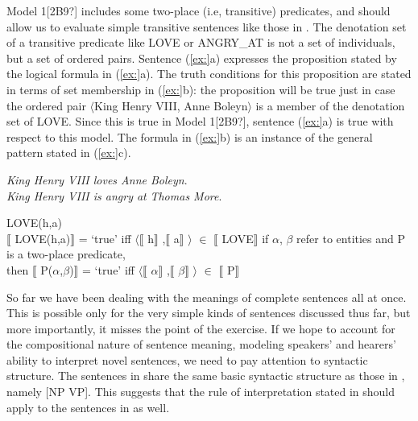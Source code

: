 Model 1[2B9?] includes some two-place (i.e, transitive) predicates, and should allow us to evaluate simple transitive sentences like those in . The denotation set of a transitive predicate like LOVE or ANGRY\_AT is not a set of individuals, but a set of ordered pairs. Sentence (\ref{ex:}a) expresses the proposition stated by the logical formula in (\ref{ex:}a). The truth conditions for this proposition are stated in terms of set membership in (\ref{ex:}b): the proposition will be true just in case the ordered pair $\langle$King Henry VIII, Anne Boleyn$\rangle$ is a member of the denotation set of LOVE. Since this is true in Model 1[2B9?], sentence (\ref{ex:}a) is true with respect to this model. The formula in (\ref{ex:}b) is an instance of the general pattern stated in (\ref{ex:}c).


\ea
\ea \textit{King Henry VIII loves Anne Boleyn}.\\
\ex \textit{King Henry VIII is angry at} \textit{Thomas More}.
                       \z
\z

\ea
\ea  LOVE(h,a)\\
\ex  $\llbracket$ LOVE(h,a)$\rrbracket$  = ‘true’  iff  $\langle$$\llbracket$ h$\rrbracket$ ,$\llbracket$ a$\rrbracket$ $\rangle$ ${\in}$ $\llbracket$ LOVE$\rrbracket$ 
\ex  if $\alpha $, $\beta $ refer to entities and P is a two-place predicate,\\
  then  $\llbracket$ P($\alpha $,$\beta $)$\rrbracket$  = ‘true’  iff  $\langle$$\llbracket$ $\alpha $$\rrbracket$ ,$\llbracket$ $\beta $$\rrbracket$ $\rangle$ ${\in}$ $\llbracket$ P$\rrbracket$ 
\z \z


So far we have been dealing with the meanings of complete sentences all at once. This is possible only for the very simple kinds of sentences discussed thus far, but more importantly, it misses the point of the exercise. If we hope to account for the compositional nature of sentence meaning, modeling speakers’ and hearers’ ability to interpret novel sentences, we need to pay attention to syntactic structure. The sentences in  share the same basic syntactic structure as those in , namely [NP VP]. This suggests that the rule of interpretation stated in  should apply to the sentences in  as well.



